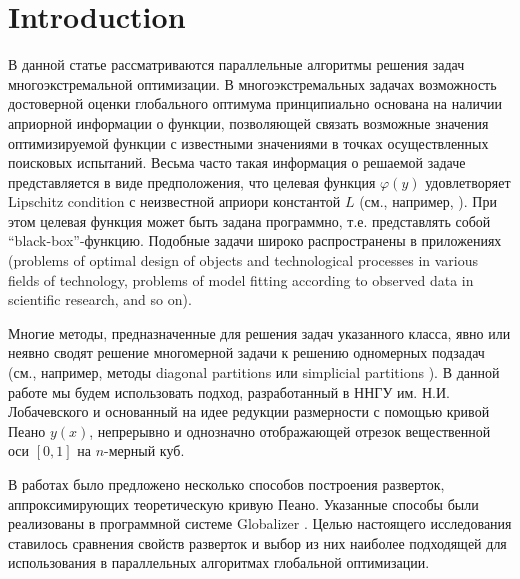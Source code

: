 \documentclass[runningheads]{llncs}
\begin{document}
\section{Introduction}\label{sec:intro}
\begin{Russian}

В данной статье рассматриваются параллельные алгоритмы решения задач многоэкстремальной оптимизации. В многоэкстремальных задачах возможность достоверной оценки глобального оптимума принципиально основана на наличии априорной информации о функции, позволяющей связать возможные значения оптимизируемой функции с известными значениями в точках осуществленных поисковых испытаний. Весьма часто такая информация о решаемой задаче представляется в виде предположения, что целевая функция $\varphi(y)$ удовлетворяет Lipschitz condition с неизвестной априори константой $L$ (см., например, \cite{Jones,Gablonsky,Evtushenko}). При этом целевая функция может быть задана программно, т.е. представлять собой “black-box”-функцию. Подобные задачи широко распространены в приложениях (problems of optimal design of objects and technological processes in various fields of technology, problems of model fitting according to observed data in scientific research, and so on).

Многие методы, предназначенные для решения задач указанного класса, явно или неявно сводят решение многомерной задачи к решению одномерных подзадач (см., например, методы diagonal partitions \cite{Sergeyev2006,SergeyevKvasov2015} или simplicial partitions \cite{Zilinskas2008,Zilinskas2014}). В данной работе мы будем использовать подход, разработанный в ННГУ им. Н.И. Лобачевского и основанный на идее редукции размерности с помощью кривой Пеано $y(x)$, непрерывно и однозначно отображающей отрезок вещественной оси $[0,1]$ на $n$-мерный куб.

В работах \cite{strongin1978,Strongin1992,Gergel2009,Goryachih2017} было предложено несколько способов построения разверток, аппроксимирующих теоретическую кривую Пеано. Указанные способы были реализованы в программной системе Globalizer \cite{globalizerSystem}. Целью настоящего исследования ставилось сравнения свойств разверток и выбор из них наиболее подходящей для использования в параллельных алгоритмах глобальной оптимизации.

\end{Russian}
\end{document}
